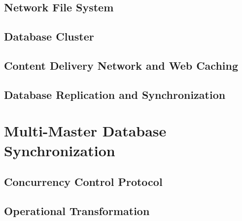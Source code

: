 \subsection{Network File System}

\subsection{Database Cluster}

\subsection{Content Delivery Network and Web Caching}

\subsection{Database Replication and Synchronization}

\section{Multi-Master Database Synchronization}

\subsection{Concurrency Control Protocol}

\subsection{Operational Transformation}